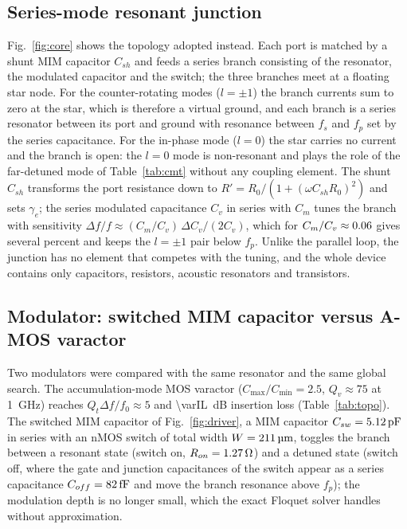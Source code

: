 \documentclass[journal]{IEEEtran}
\begin{document}
\subsection{Series-mode resonant junction}
Fig.~\ref{fig:core} shows the topology adopted instead. Each port is matched by a shunt MIM capacitor $C_{sh}$ and feeds a series branch consisting of the resonator, the modulated capacitor and the switch; the three branches meet at a floating star node. For the counter-rotating modes ($l=\pm1$) the branch currents sum to zero at the star, which is therefore a virtual ground, and each branch is a series resonator between its port and ground with resonance between $f_s$ and $f_p$ set by the series capacitance. For the in-phase mode ($l=0$) the star carries no current and the branch is open: the $l=0$ mode is non-resonant and plays the role of the far-detuned mode of Table~\ref{tab:cmt} without any coupling element. The shunt $C_{sh}$ transforms the port resistance down to $R'=R_0/(1+(\omega C_{sh}R_0)^2)$ and sets $\gamma_e$; the series modulated capacitance $C_v$ in series with $C_m$ tunes the branch with sensitivity $\Delta f/f\approx (C_m/C_v)\,\Delta C_v/(2C_v)$, which for $C_m/C_v\approx0.06$ gives several percent and keeps the $l=\pm1$ pair below $f_p$. Unlike the parallel loop, the junction has no element that competes with the tuning, and the whole device contains only capacitors, resistors, acoustic resonators and transistors.

\subsection{Modulator: switched MIM capacitor versus A-MOS varactor}
Two modulators were compared with the same resonator and the same global search. The accumulation-mode MOS varactor \cite{andreani2000use} ($C_{\max}/C_{\min}=2.5$, $Q_v\approx75$ at \SI{1}{GHz}) reaches $Q_t\Delta f/f_0\approx5$ and \SI{\varIL}{dB} insertion loss (Table~\ref{tab:topo}). The switched MIM capacitor of Fig.~\ref{fig:driver}, a MIM capacitor $C_{sw}=\SI{5.12}{pF}$ in series with an nMOS switch of total width $W=\SI{211}{\micro\meter}$, toggles the branch between a resonant state (switch on, $R_{on}=\SI{1.27}{\ohm}$) and a detuned state (switch off, where the gate and junction capacitances of the switch appear as a series capacitance $C_{off}=\SI{82}{fF}$ and move the branch resonance above $f_p$); the modulation depth is no longer small, which the exact Floquet solver handles without approximation.
\end{document}
